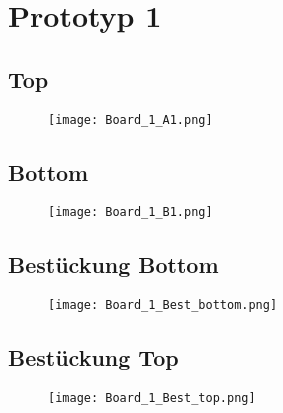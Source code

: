 






\section{Prototyp 1}
\label{Prototyp 1}

\subsection*{Top}
\begin{figure}[htb]
\begin{center}
\texttt{[image: Board\_1\_A1.png]}
\end{center}
\end{figure}

\newpage
\subsection*{Bottom}
\begin{figure}[htb]
\begin{center}
\texttt{[image: Board\_1\_B1.png]}
\end{center}
\end{figure}

\newpage
\subsection*{Bestückung Bottom}
\begin{figure}[htb]
\begin{center}
\texttt{[image: Board\_1\_Best\_bottom.png]}
\end{center}
\end{figure}

\newpage
\subsection*{Bestückung Top}
\begin{figure}[htb]
\begin{center}
\texttt{[image: Board\_1\_Best\_top.png]}
\end{center}
\end{figure}





